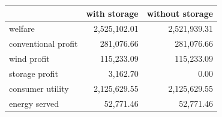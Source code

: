 \begin{tabular}{lrr}
\toprule
 & with storage & without storage \\
\midrule
welfare & 2,525,102.01 & 2,521,939.31 \\
conventional profit & 281,076.66 & 281,076.66 \\
wind profit & 115,233.09 & 115,233.09 \\
storage profit & 3,162.70 & 0.00 \\
consumer utility & 2,125,629.55 & 2,125,629.55 \\
energy served & 52,771.46 & 52,771.46 \\
\bottomrule
\end{tabular}

